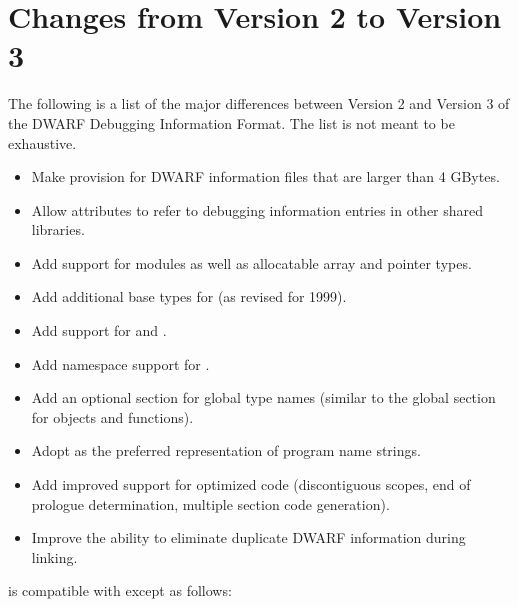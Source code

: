 \section{Changes from Version 2 to Version 3}
The following is a list of the major differences between
Version 2 and Version 3 of the DWARF Debugging Information
Format. The list is not meant to be exhaustive.

\begin{itemize}
\item
Make provision for DWARF information files that are larger
than 4 GBytes.

\item
Allow attributes to refer to debugging information entries
in other shared libraries.

\item
Add support for  modules as well as allocatable
array and pointer types.

\item
Add additional base types for  (as revised for 1999).

\item
Add support for  and .

\item
Add namespace support for .

\item
Add an optional section for global type names (similar to
the global section for objects and functions).

\item
Adopt  as the preferred representation of program name strings.
\item
Add improved support for optimized code (discontiguous
scopes, end of prologue determination, multiple section
code generation).  

\item Improve the ability to eliminate
duplicate DWARF information during linking.  

\end{itemize}

is compatible with 
 except as follows:

